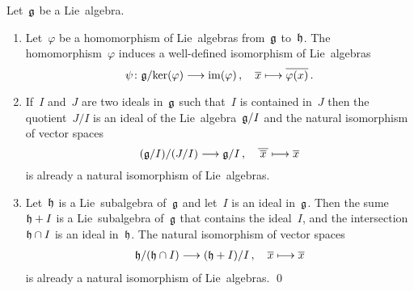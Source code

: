 

\begin{corollary}
  Let~$\mathfrak{g}$ be a Lie~algebra.
  \begin{enumerate}
    \item
      Let~$\varphi$ be a homomorphism of Lie~algebras from~$\mathfrak{g}$ to~$\mathfrak{h}$.
      The homomorphism~$\varphi$ induces a well-defined isomorphism of Lie~algebras
      \[
        \psi
        \colon
        \glie / {\ker(\varphi)}
        \to
        \im(\varphi)  \,,
        \quad
        \class{x}
        \mapsto
        \class{\varphi(x)} \,.
      \]
    \item
      If~$I$ and~$J$ are two ideals in~$\mathfrak{g}$ such that~$I$ is contained in~$J$ then the quotient~$J/I$ is an ideal of the Lie~algebra~$\mathfrak{g}/I$ and the natural isomorphism of vector spaces
      \[
        (\glie/I) / (J/I)
        \to
        \glie/I \,,
        \quad
        \class{ \,\class{x}\, }
        \mapsto
        \class{x}
      \]
      is already a natural isomorphism of Lie~algebras.
    \item
      Let~$\mathfrak{h}$ is a Lie~subalgebra of~$\mathfrak{g}$ and let~$I$ is an ideal in~$\mathfrak{g}$.
      Then the sume~$\mathfrak{h} + I$ is a Lie~subalgebra of~$\mathfrak{g}$ that contains the ideal~$I$, and the intersection~$\mathfrak{h} \cap I$ is an ideal in~$\mathfrak{h}$.
      The natural isomorphism of vector spaces
      \begin{gather*}
        \hlie/(\hlie \cap I)
        \to
        (\hlie + I)/I \,,
        \quad
        \class{x}
        \mapsto
        \class{x}
      \end{gather*}
      is already a natural isomorphism of Lie~algebras.
    \qed
  \end{enumerate}
\end{corollary}


